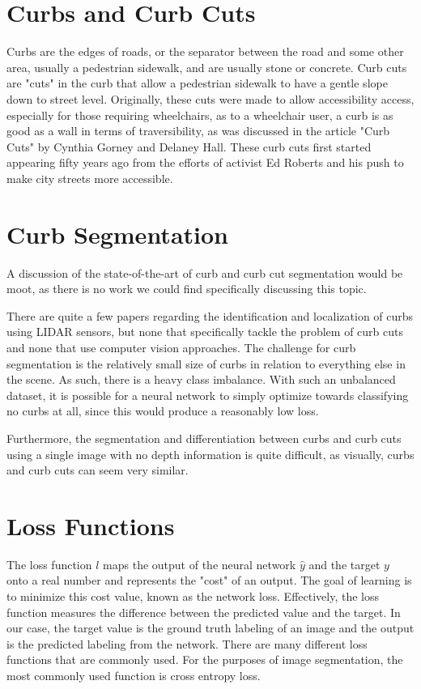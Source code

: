 \section{Curbs and Curb Cuts}\label{section:background-curbs}
Curbs are the edges of roads, or the separator between the road and some other area, usually a pedestrian sidewalk, and are usually stone or concrete.
Curb cuts are "cuts" in the curb that allow a pedestrian sidewalk to have a gentle slope down to street level.
Originally, these cuts were made to allow accessibility access, especially for those requiring wheelchairs, as to a wheelchair user, a curb is as good as a wall in terms of traversibility, as was discussed in the article "Curb Cuts" by Cynthia Gorney and Delaney Hall. These curb cuts first started appearing fifty years ago from the efforts of activist Ed Roberts and his push to make city streets more accessible.

\section{Curb Segmentation}\label{section:background-curbsegmentation}
A discussion of the state-of-the-art of curb and curb cut segmentation would be moot, as there is no work we could find specifically discussing this topic.

There are quite a few papers regarding the identification and localization of curbs using LIDAR sensors, but none that specifically tackle the problem of curb cuts and none that use computer vision approaches.
The challenge for curb segmentation is the relatively small size of curbs in relation to everything else in the scene.
As such, there is a heavy class imbalance.
With such an unbalanced dataset, it is possible for a neural network to simply optimize towards classifying no curbs at all, since this would produce a reasonably low loss.

Furthermore, the segmentation and differentiation between curbs and curb cuts using a single image with no depth information is quite difficult, as visually, curbs and curb cuts can seem very similar.

\section{Loss Functions}\label{section:background-loss}
The loss function $l$ maps the output of the neural network $\hat{y}$ and the target $y$ onto a real number and represents the "cost" of an output.
The goal of learning is to minimize this cost value, known as the network loss.
Effectively, the loss function measures the difference between the predicted value and the target.
In our case, the target value is the ground truth labeling of an image and the output is the predicted labeling from the network.
There are many different loss functions that are commonly used. For the purposes of image segmentation, the most commonly used function is cross entropy loss.

